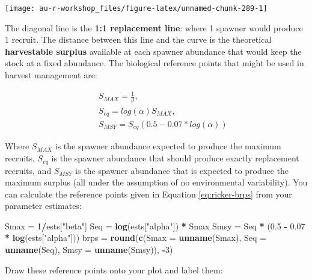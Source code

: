 \documentclass[]{book}
\newenvironment{Shaded}{\begin{snugshade}}{\end{snugshade}}
\newcommand{\KeywordTok}[1]{\textcolor[rgb]{0.13,0.29,0.53}{\textbf{#1}}}
\newcommand{\DataTypeTok}[1]{\textcolor[rgb]{0.13,0.29,0.53}{#1}}
\newcommand{\DecValTok}[1]{\textcolor[rgb]{0.00,0.00,0.81}{#1}}
\newcommand{\FloatTok}[1]{\textcolor[rgb]{0.00,0.00,0.81}{#1}}
\newcommand{\StringTok}[1]{\textcolor[rgb]{0.31,0.60,0.02}{#1}}
\newcommand{\OperatorTok}[1]{\textcolor[rgb]{0.81,0.36,0.00}{\textbf{#1}}}
\newcommand{\NormalTok}[1]{#1}
\theoremstyle{definition}
\theoremstyle{definition}
\theoremstyle{definition}
\theoremstyle{remark}
\begin{document}
\begin{center}\texttt{[image: au-r-workshop\_files/figure-latex/unnamed-chunk-289-1]} \end{center}

The diagonal line is the \textbf{1:1 replacement line}: where 1 spawner
would produce 1 recruit. The distance between this line and the curve is
the theoretical \textbf{harvestable surplus} available at each spawner
abundance that would keep the stock at a fixed abundance. The biological
reference points that might be used in harvest management are:

\begin{eqnarray*}
&& S_{MAX}=\frac{1}{\beta},\\
&& S_{eq}=log(\alpha) S_{MAX},\\
&& S_{MSY}=S_{eq} \left(0.5-0.07*log(\alpha)\right)
\label{eq:ricker-brps}
\end{eqnarray*}

Where \(S_{MAX}\) is the spawner abundance expected to produce the
maximum recruits, \(S_{eq}\) is the spawner abundance that should
produce exactly replacement recruits, and \(S_{MSY}\) is the spawner
abundance that is expected to produce the maximum surplus (all under the
assumption of no environmental variability). You can calculate the
reference points given in Equation \eqref{eq:ricker-brps} from your
parameter estimates:

\begin{Shaded}
\begin{Highlighting}[]
\NormalTok{Smax =}\StringTok{ }\DecValTok{1}\OperatorTok{/}\NormalTok{ests[}\StringTok{"beta"}\NormalTok{]}
\NormalTok{Seq =}\StringTok{ }\KeywordTok{log}\NormalTok{(ests[}\StringTok{"alpha"}\NormalTok{]) }\OperatorTok{*}\StringTok{ }\NormalTok{Smax}
\NormalTok{Smsy =}\StringTok{ }\NormalTok{Seq }\OperatorTok{*}\StringTok{ }\NormalTok{(}\FloatTok{0.5} \OperatorTok{-}\StringTok{ }\FloatTok{0.07} \OperatorTok{*}\StringTok{ }\KeywordTok{log}\NormalTok{(ests[}\StringTok{"alpha"}\NormalTok{]))}
\NormalTok{brps =}\StringTok{ }\KeywordTok{round}\NormalTok{(}\KeywordTok{c}\NormalTok{(}\DataTypeTok{Smax =} \KeywordTok{unname}\NormalTok{(Smax),}
               \DataTypeTok{Seq =} \KeywordTok{unname}\NormalTok{(Seq),}
               \DataTypeTok{Smsy =} \KeywordTok{unname}\NormalTok{(Smsy)), }\OperatorTok{-}\DecValTok{3}\NormalTok{)}
\end{Highlighting}
\end{Shaded}

Draw these reference points onto your plot and label them:
\end{document}
